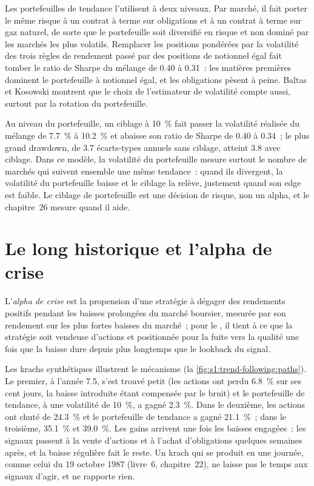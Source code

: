 Les portefeuilles de tendance l'utilisent à deux niveaux. Par marché, il fait porter le même risque à un contrat à terme sur obligations et à un contrat à terme sur gaz naturel, de sorte que le portefeuille soit diversifié en
risque et non dominé par les marchés les plus volatils. Remplacer les positions pondérées par la volatilité des trois règles de rendement passé par des positions de notionnel égal
fait tomber le ratio de Sharpe du mélange de 0.40 à 0.31~: les matières premières dominent le portefeuille à notionnel égal, et les obligations pèsent à peine. Baltas et Kosowski
montrent que le choix de l'estimateur de volatilité compte aussi, surtout par la rotation du portefeuille.

Au niveau du portefeuille, un ciblage à 10~\% fait passer la volatilité réalisée du mélange de 7.7~\% à 10.2~\% et abaisse son ratio de Sharpe de 0.40 à 0.34~; le
plus grand drawdown, de 3.7 écarts-types annuels sans ciblage, atteint 3.8 avec ciblage. Dans ce modèle, la volatilité du portefeuille mesure surtout le nombre de marchés qui
suivent ensemble une même tendance~: quand ils divergent, la volatilité du portefeuille baisse et le ciblage la relève, justement quand son edge est faible. Le ciblage de portefeuille est une décision de risque,
non un alpha, et le chapitre~26 mesure quand il aide.

\section{Le long historique et l'alpha de crise}

\begin{definition}\label{def:s1:trend-following:crisis}
L'\emph{alpha de crise} est la propension d'une stratégie à dégager des rendements positifs pendant les baisses prolongées du marché boursier, mesurée par son
rendement sur les plus fortes baisses du marché~; pour le , il tient à ce que la stratégie soit vendeuse d'actions et positionnée pour la fuite vers la qualité une fois que la
baisse dure depuis plus longtemps que le lookback du signal.
\end{definition}

Les krachs synthétiques illustrent le mécanisme (la \cref{fig:s1:trend-following:paths}). Le premier, à l'année 7.5, s'est trouvé petit (les actions ont perdu 6.8~\% sur
ses cent jours, la baisse introduite étant compensée par le bruit) et le portefeuille de tendance, à une volatilité de 10~\%, a gagné 2.3~\%. Dans le deuxième, les actions ont chuté de 24.3~\% et le
portefeuille de tendance a gagné 21.1~\%~; dans le troisième, 35.1~\% et 39.0~\%. Les gains arrivent une fois les baisses engagées~: les signaux passent à la vente d'actions et à l'achat d'obligations quelques
semaines après, et la baisse régulière fait le reste. Un krach qui se produit en une journée, comme celui du 19 octobre 1987 (livre~6, chapitre~22), ne laisse pas le temps aux signaux d'agir, et
ne rapporte rien.

